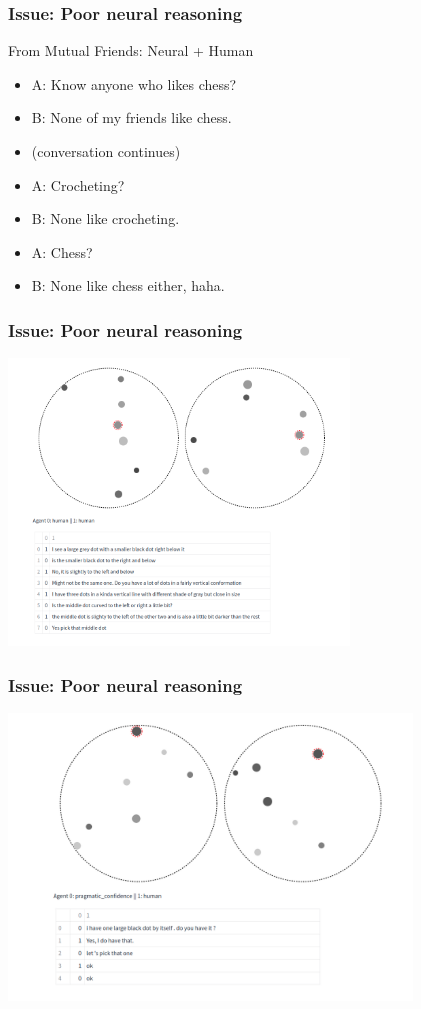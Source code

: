 \documentclass{beamer}
\begin{document}
\begin{frame}
\frametitle{Issue: Poor neural reasoning}
From Mutual Friends: Neural + Human
\begin{itemize}
\item A: Know anyone who likes chess?
\item B: None of my friends like chess.
\item (conversation continues)
\item A: Crocheting?
\item B: None like crocheting.
\item A: Chess?
\item B: None like chess either, haha.
\end{itemize}
\end{frame}

\begin{frame}
\frametitle{Issue: Poor neural reasoning}
\centering
\includegraphics[height=3in]{img/oc-success.png}
\end{frame}

\begin{frame}
\frametitle{Issue: Poor neural reasoning}
\centering
\includegraphics[height=3in]{img/oc-failure.png}
\end{frame}
\end{document}
